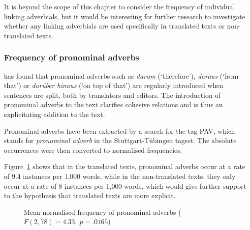 \documentclass[output=paper]{LSP/langsci}
\begin{document}
\noindent It is beyond the scope of this chapter to consider the frequency of individual linking adverbials, but it would be interesting for further research to investigate whether any linking adverbials are used specifically in translated texts or non-translated texts.

\subsubsection{Frequency of pronominal adverbs}\label{bisiada:sec:pav}

\textcite[14--15]{bisiada14} has found that pronominal adverbs such as \emph{darum} (`therefore'), \emph{daraus} (`from that') or \emph{darüber hinaus} (`on top of that') are regularly introduced when sentences are split, both by translators and editors. The introduction of pronominal adverbs to the text clarifies cohesive relations \parencite{kunlap15} and is thus an explicitating addition to the text.

Pronominal adverbs have been extracted by a search for the tag PAV, which stands for \emph{pronominal adverb} in the Stuttgart-Tübingen tagset. The absolute occurrences were then converted to normalised frequencies.

Figure~\ref{bisiada:fig:pav} shows that in the translated texts, pronominal adverbs occur at a rate of 9.4 instances per 1,000 words, while in the non-translated texts, they only occur at a rate of 8 instances per 1,000 words, which would give further support to the hypothesis that translated texts are more explicit.

\begin{figure}
  \caption{Mean normalised frequency of pronominal adverbs ($F(2,78)=4.33,~p=.0165$)}\label{bisiada:fig:pav}
\end{figure}
\end{document}
